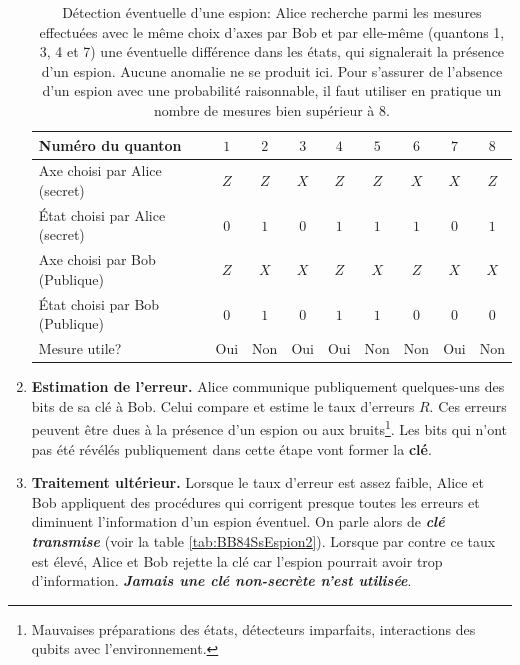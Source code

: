 \begin{enumerate}
\begin{table}[htbp]
\centering
\begin{tabular}
[c]{|l|c|c|c|c|c|c|c|c|}\hline
\rowcolor[gray]{0.8}Numéro du quanton & $1$ & $2$ & $3$ & $4$ & $5$ & $6$ & $7$
& $8$\\\hline
Axe choisi par Alice (secret) & $Z$ & $Z$ & $X$ & $Z$ & $Z$ & $X$ & $X$ &
$Z$\\\hline
État choisi par Alice (secret) & $0$ & $1$ & $0$ & $1$ & $1$ & $1$ & $0$ &
$1$\\\hline
Axe choisi par Bob (Publique) & $Z$ & $X$ & $X$ & $Z$ & $X$ & $Z$ & $X$ &
$X$\\\hline
État choisi par Bob (Publique) & $0$ & $1$ & $0$ & $1$ & $1$ & $0$ & $0$ &
$0$\\\hline
Mesure utile? & \multicolumn{1}{|l|}{Oui} & \multicolumn{1}{|l|}{Non} &
\multicolumn{1}{|l|}{Oui} & \multicolumn{1}{|l|}{Oui} &
\multicolumn{1}{|l|}{Non} & \multicolumn{1}{|l|}{Non} &
\multicolumn{1}{|l|}{Oui} & \multicolumn{1}{|l|}{Non}\\\hline
\end{tabular}
\caption{Détection éventuelle d'une espion: Alice recherche parmi les mesures
effectuées  avec le même choix d'axes par Bob et par elle-même (quantons 1, 3, 4
et 7) une éventuelle différence dans les états, qui signalerait la présence d'un
espion. Aucune anomalie ne se produit ici. Pour s'assurer de l'absence d'un
espion avec une probabilité raisonnable, il faut utiliser en pratique un nombre
de mesures bien supérieur à 8.}
\label{tab:BB84SsEspion}%
\end{table}%

\item \textbf{Estimation de l'erreur.} Alice communique publiquement
quelques-uns des bits de sa clé à Bob. Celui compare et estime le taux d'erreurs
$R$. Ces erreurs peuvent être dues à la présence d'un espion ou aux
bruits\footnote{Mauvaises préparations des états, détecteurs imparfaits,
interactions des qubits avec l'environnement.}. Les bits qui n'ont pas été
révélés publiquement dans cette étape vont former la \textbf{clé}.

\item \textbf{Traitement ultérieur.} Lorsque le taux d'erreur est assez faible,
Alice et Bob appliquent des procédures qui corrigent presque toutes les erreurs
et diminuent l'information d'un espion éventuel. On parle alors de
\textbf{\emph{clé transmise}} (voir la table \ref{tab:BB84SsEspion2}). Lorsque
par contre ce taux est élevé, Alice et Bob rejette la clé car l'espion pourrait
avoir trop d'information. \textbf{\emph{Jamais une clé non-secrète n'est
utilisée}}.
\end{enumerate}

